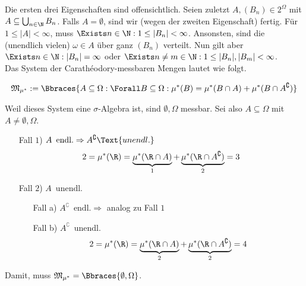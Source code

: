 \begin{solution}

Die ersten drei Eigenschaften sind offensichtlich. Seien zuletzt $A, (B_n) \in 2^\Omega$ mit $A \subseteq \bigcup_{n \in \N} B_n$. Falls $A = \emptyset$, sind wir (wegen der zweiten Eigenschaft) fertig. Für $1 \leq |A| < \infty$, muss $\Exists n \in \N: 1 \leq |B_n| < \infty$. Ansonsten, sind die (unendlich vielen) $\omega \in A$ über ganz $(B_n)$ verteilt. Nun gilt aber $\Exists n \in \N: |B_n| = \infty$ oder $\Exists n \neq m \in \N: 1 \leq |B_n|, |B_m| < \infty$. \\

Das System der Carathéodory-messbaren Mengen lautet wie folgt.

\begin{align*}
  \mathfrak{M}_{\mu^\ast} :=
  \Bbraces
  {
    A \subseteq \Omega:
    \Forall B \subseteq \Omega:
    \mu^\ast(B) = \mu^\ast(B \cap A) + \mu^\ast(B \cap A^\complement)
  }
\end{align*}

Weil dieses System eine $\sigma$-Algebra ist, sind $\emptyset, \Omega$ messbar. Sei also $A \subseteq \Omega$ mit $A \neq \emptyset, \Omega$.

\begin{itemize}

  \item[Fall $1$)] $A \enspace \text{endl.} \Rightarrow A^\complement \Text{unendl.}$
  \begin{align*}
    2 = \mu^\ast(\R) =
    \underbrace{\mu^\ast(\R \cap A)}_1 +
    \underbrace{\mu^\ast(\R \cap A^\complement)}_2 = 3
  \end{align*}

  \item[Fall $2$)] $A \enspace \text{unendl.}$
  \begin{itemize}
    \item[Fall a)] $A^\complement \enspace \text{endl.} \Rightarrow$ analog zu Fall $1$
    \item[Fall b)] $A^\complement \enspace \text{unendl.}$
    \begin{align*}
      2 = \mu^\ast(\R) =
      \underbrace{\mu^\ast(\R \cap A)}_2 +
      \underbrace{\mu^\ast(\R \cap A^\complement)}_2 = 4
    \end{align*}
  \end{itemize}

\end{itemize}

Damit, muss $\mathfrak{M}_{\mu^\ast} = \Bbraces{\emptyset, \Omega}$.

\end{solution}

